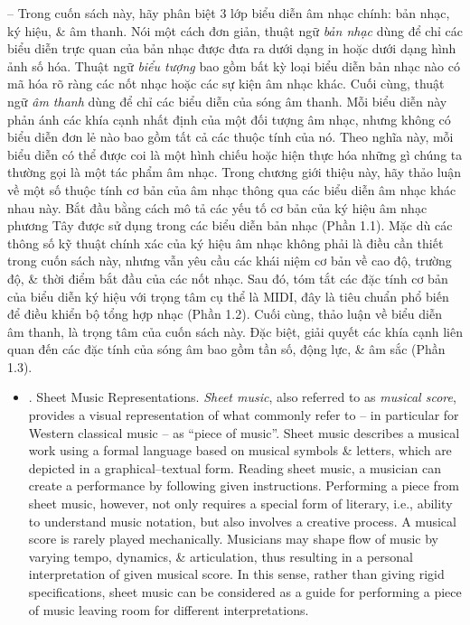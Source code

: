 \documentclass{article}
\begin{document}
\begin{itemize}
	-- Trong cuốn sách này, hãy phân biệt 3 lớp biểu diễn âm nhạc chính: bản nhạc, ký hiệu, \& âm thanh. Nói một cách đơn giản, thuật ngữ {\it bản nhạc} dùng để chỉ các biểu diễn trực quan của bản nhạc được đưa ra dưới dạng in hoặc dưới dạng hình ảnh số hóa. Thuật ngữ {\it biểu tượng} bao gồm bất kỳ loại biểu diễn bản nhạc nào có mã hóa rõ ràng các nốt nhạc hoặc các sự kiện âm nhạc khác. Cuối cùng, thuật ngữ {\it âm thanh} dùng để chỉ các biểu diễn của sóng âm thanh. Mỗi biểu diễn này phản ánh các khía cạnh nhất định của một đối tượng âm nhạc, nhưng không có biểu diễn đơn lẻ nào bao gồm tất cả các thuộc tính của nó. Theo nghĩa này, mỗi biểu diễn có thể được coi là một hình chiếu hoặc hiện thực hóa những gì chúng ta thường gọi là một tác phẩm âm nhạc. Trong chương giới thiệu này, hãy thảo luận về một số thuộc tính cơ bản của âm nhạc thông qua các biểu diễn âm nhạc khác nhau này. Bắt đầu bằng cách mô tả các yếu tố cơ bản của ký hiệu âm nhạc phương Tây được sử dụng trong các biểu diễn bản nhạc (Phần 1.1). Mặc dù các thông số kỹ thuật chính xác của ký hiệu âm nhạc không phải là điều cần thiết trong cuốn sách này, nhưng vẫn yêu cầu các khái niệm cơ bản về cao độ, trường độ, \& thời điểm bắt đầu của các nốt nhạc. Sau đó, tóm tắt các đặc tính cơ bản của biểu diễn ký hiệu với trọng tâm cụ thể là MIDI, đây là tiêu chuẩn phổ biến để điều khiển bộ tổng hợp nhạc (Phần 1.2). Cuối cùng, thảo luận về biểu diễn âm thanh, là trọng tâm của cuốn sách này. Đặc biệt, giải quyết các khía cạnh liên quan đến các đặc tính của sóng âm bao gồm tần số, động lực, \& âm sắc (Phần 1.3).
	\begin{itemize}
		\item {. Sheet Music Representations.} {\it Sheet music}, also referred to as {\it musical score}, provides a visual representation of what commonly refer to -- in particular for Western classical music -- as ``piece of music''. Sheet music describes a musical work using a formal language based on musical symbols \& letters, which are depicted in a graphical--textual form. Reading sheet music, a musician can create a performance by following given instructions. Performing a piece from sheet music, however, not only requires a special form of literary, i.e., ability to understand music notation, but also involves a creative process. A musical score is rarely played mechanically.  Musicians may shape flow of music by varying tempo, dynamics, \& articulation, thus resulting in a personal interpretation of given musical score. In this sense, rather than giving rigid specifications, sheet music can be considered as a guide for performing a piece of music leaving room for different interpretations.
		

\end{itemize}
\end{itemize}
\end{document}

